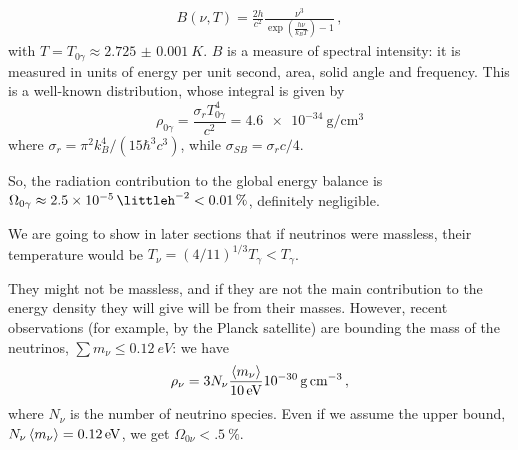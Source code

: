 \documentclass[main.tex]{subfiles}
\begin{document}
%
\begin{align}
B (\nu, T) = \frac{2 h}{c^2} \frac{\nu^3}{\exp(\frac{h \nu }{k_B T}) - 1}
\,,
\end{align}
%
with \(T = T_{0 \gamma } \approx \SI{2.725(1)}{K}\). \(B\) is a measure of spectral intensity: it is measured in units of energy per unit second, area, solid angle and frequency. This is a well-known distribution, whose integral is given by
%
\begin{equation}
  \rho_{0 \gamma} = \frac{\sigma_r T_{0 \gamma}^4}{c^2} = \SI{4.6e-34}{\gram\per\centi\metre\cubed}
\end{equation}
%
where \(\sigma_r = \pi^2 k_B^4 / (15 \hbar ^3 c^3)\), while \(\sigma_{SB} = \sigma_r c /4\).


So, the radiation contribution to the global energy balance is \(\Omega_{0 \gamma } \approx \SI{2.5e-5}{\littleh^{-2}} < \SI{.01}{\percent}\), definitely negligible.


We are going to show in later sections
that if neutrinos were massless, their temperature would be \(T_\nu = (4/11)^{1/3} T_\gamma < T_\gamma \).

They might not be massless, and if they are not the main contribution to the energy density they will give will be from their masses.
However, recent observations (for example, by the Planck satellite) are bounding the mass of the neutrinos,
\(\sum m_\nu \leq \SI{0.12}{eV} \): we have 
%
\begin{equation}
\rho_\nu = 3 N_\nu \frac{\expval{m_\nu} }{\SI{10}{eV}} \SI{e-30}{\gram\per\cubic\centi\metre}
\,,
\end{equation}
%
where \(N_{\nu }\) is the number of neutrino species. 
Even if we assume the upper bound, \(N_{\nu } \expval{m_{\nu }} = \SI{.12}{eV}\), we get \(\Omega_{0 \nu } < \SI{.5}{\percent}\). 
\end{document}
